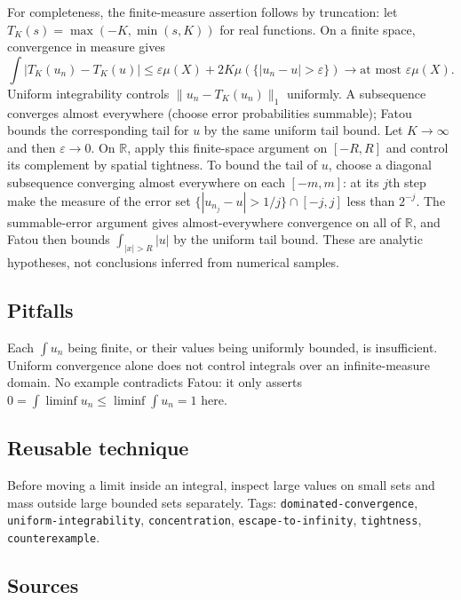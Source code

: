 \documentclass[
  11pt,
]{article}
\begin{document}
For completeness, the finite-measure assertion follows by truncation:
let \(T_K(s)=\max(-K,\min(s,K))\) for real functions. On a finite space,
convergence in measure gives \[
\int|T_K(u_n)-T_K(u)|\le\varepsilon\mu(X)+2K\mu(\{|u_n-u|>\varepsilon\})\longrightarrow\text{at most }\varepsilon\mu(X).
\] Uniform integrability controls \(\|u_n-T_K(u_n)\|_1\) uniformly. A
subsequence converges almost everywhere (choose error probabilities
summable); Fatou bounds the corresponding tail for \(u\) by the same
uniform tail bound. Let \(K\to\infty\) and then \(\varepsilon\to0\). On
\(\mathbb R\), apply this finite-space argument on \([-R,R]\) and
control its complement by spatial tightness. To bound the tail of \(u\),
choose a diagonal subsequence converging almost everywhere on each
\([-m,m]\): at its \(j\)th step make the measure of the error set
\(\{|u_{n_j}-u|>1/j\}\cap[-j,j]\) less than \(2^{-j}\). The
summable-error argument gives almost-everywhere convergence on all of
\(\mathbb R\), and Fatou then bounds \(\int_{|x|>R}|u|\) by the uniform
tail bound. These are analytic hypotheses, not conclusions inferred from
numerical samples.

\subsection{Pitfalls}\label{pitfalls-13}

Each \(\int u_n\) being finite, or their values being uniformly bounded,
is insufficient. Uniform convergence alone does not control integrals
over an infinite-measure domain. No example contradicts Fatou: it only
asserts \(0=\int\liminf u_n\le\liminf\int u_n=1\) here.

\subsection{Reusable technique}\label{reusable-technique-13}

Before moving a limit inside an integral, inspect large values on small
sets and mass outside large bounded sets separately. Tags:
\texttt{dominated-\allowbreak{}convergence}, \texttt{uniform-\allowbreak{}integrability},
\texttt{concentration}, \texttt{escape-\allowbreak{}to-\allowbreak{}infinity}, \texttt{tightness},
\texttt{counterexample}.

\subsection{Sources}\label{sources-13}
\end{document}

